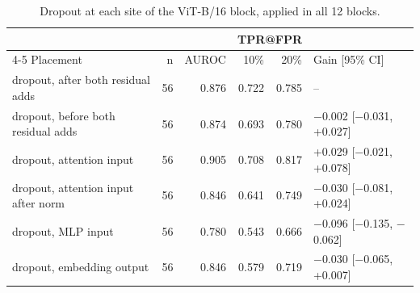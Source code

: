 \begin{table}[htbp]
\centering
\small
\caption{Dropout at each site of the ViT-B/16 block, applied in all 12 blocks.}
\label{tab:staircase-dropout-sites}
\begin{tabular}{lrrrrl}
\toprule
 & & & \multicolumn{2}{c}{TPR@FPR} & \\
\cmidrule(lr){4-5}
Placement & n & AUROC & 10\% & 20\% & Gain [95\% CI] \\
\midrule
dropout, after both residual adds & 56 & 0.876 & 0.722 & 0.785 & -- \\
dropout, before both residual adds & 56 & 0.874 & 0.693 & 0.780 & $-$0.002 [$-$0.031, +0.027] \\
dropout, attention input & 56 & 0.905 & 0.708 & 0.817 & +0.029 [$-$0.021, +0.078] \\
dropout, attention input after norm & 56 & 0.846 & 0.641 & 0.749 & $-$0.030 [$-$0.081, +0.024] \\
dropout, MLP input & 56 & 0.780 & 0.543 & 0.666 & $-$0.096 [$-$0.135, $-$0.062] \\
dropout, embedding output & 56 & 0.846 & 0.579 & 0.719 & $-$0.030 [$-$0.065, +0.007] \\
\bottomrule
\end{tabular}
\end{table}
